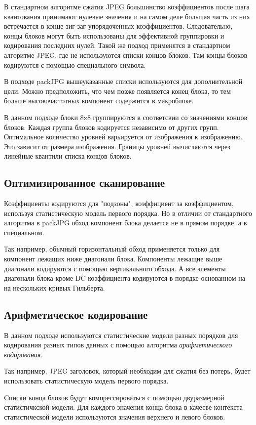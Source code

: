 \documentclass{matmex-diploma-custom}
\begin{document}
В стандартном алгоритме сжатия JPEG большинство коэффициентов после шага квантования принимают нулевые значения и на самом деле большая часть из них встречается в конце зиг-заг упорядоченных коэффициентов. Следовательно, концы блоков могут быть использованы для эффективной группировки и кодирования последних нулей. Такой же подход применятся в стандартном алгоритме JPEG, где не используются списки концов блоков. Там концы блоков кодируются с помощью специального символа.

В подходе packJPG вышеуказанные списки используются для дополнительной цели. Можно предположить, что чем позже появляется конец блока, то тем больше высокочастотных компонент содержится в макроблоке.

В данном подходе блоки 8x8 группируются в соответсвии со значениями концов блоков. Каждая группа блоков кодируется независимо от других групп. Оптимальное количество уровней варьируется от изображения к изображению. Это зависит от размера изображения. Границы уровней вычисляются через линейные квантили списка концов блоков.

\subsection{Оптимизированное сканирование}
Коэффициенты кодируются для "подзоны", коэффициент за коэффициентом, используя статистическую модель первого порядка. Но в отличии от стандартного алгоритма в packJPG обход компонент блока делается не в прямом порядке, а в специальном.

Так например, обычный горизонтальный обход применяется только для компонент лежащих ниже диагонали блока. Компоненты лежащие выше диагонали кодируются с помощью вертикального обхода. А все элементы диагонали блока кроме DC коэффициента кодируются в порядке основанном на на нескольких кривых Гильберта.

\subsection{Арифметическое кодирование}

В данном подходе используются статистические модели разных порядков для кодирования разных типов данных с помощью алгоритма  \emph{арифметического кодирования}.

Так например, JPEG заголовок, который необходим для сжатия без потерь, будет использовать статистическую модель первого порядка.

Cписки конца блоков будут компрессироваться с помощью двуразмерной статистичкской модели. Для каждого значения конца блока в качесве контекста статистической модели используются значения верхнего и левого блоков.
\end{document}
